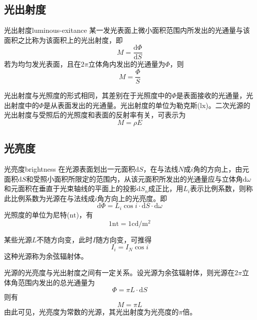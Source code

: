 \documentclass[cn,10pt,chinesefont=founder,math=mtpro2,cite=super,toc=onecol,twoside,openany]{elegantbook}
\begin{document}
\subsection{光出射度}
\begin{definition}{光出射度}{luminous-exitance}
某一发光表面上微小面积范围内所发出的光通量与该面积之比称为该面积上的光出射度，即
\begin{equation}
M=\frac{\mathrm{d}\varPhi}{\mathrm{d}S}
\end{equation}
若为均匀发光表面，且在$2\pi$立体角内发出的光通量为$\varPhi$，则
\begin{equation}
M=\frac{\varPhi}{S}
\end{equation}
\end{definition}
光出射度与光照度的形式相同，其差别在于光照度中的$\varPhi$是表面接收的光通量，光出射度中的$\varPhi$是从表面发出的光通量。光出射度的单位为勒克斯($\mathrm{lx}$)。二次光源的光出射度与受照后的光照度和表面的反射率有关，可表示为
\begin{equation}
M=\rho E
\label{eq:luminous-exitance}
\end{equation}

\subsection{光亮度}
\begin{definition}{光亮度}{brightness}
	在光源表面划出一元面积$\mathrm{d}S$，在与法线$N$成$i$角的方向上，由元面积$\mathrm{d}S$和受照小面积所限定的范围内，从该元面积所发出的光通量应与立体角$\mathrm{d}\omega$和元面积在垂直于光束轴线的平面上的投影$\mathrm{d}S_n$成正比，用$L_i$表示比例系数，则称此比例系数为光源在与法线成$i$角方向上的光亮度。即
	\begin{equation}
	\mathrm{d}\varPhi=L_i\cos i\cdot\mathrm{d}S\cdot\mathrm{d}\omega
	\end{equation}
	光照度的单位为尼特($\mathrm{nt}$)，有
	\begin{equation}
	1\mathrm{nt}=1\mathrm{cd/m^2}
	\end{equation}
\end{definition}
某些光源$L$不随方向变，此时$I$随方向变，可推得
\begin{equation}
I_i=I_N\cos i
\end{equation}
这种光源称为余弦辐射体。

光源的光亮度与光出射度之间有一定关系。设光源为余弦辐射体，则光源在$2\pi$立体角范围内发出的总光通量为
\begin{equation}
\varPhi=\pi L\cdot\mathrm{d}S
\end{equation}
则有
\begin{equation}
M=\pi L
\end{equation}
由此可见，光亮度为常数的光源，其光出射度为光亮度的$\pi$倍。
\end{document}
